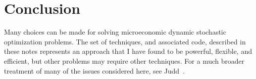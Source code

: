 \documentclass[SolvingMicroDSOPs]{subfiles}
\begin{document}
\hypertarget{conclusion}{}
\section{Conclusion}

Many choices can be made for solving microeconomic dynamic stochastic optimization problems.  The set of techniques, and associated code, described in these notes represents an approach that I have found to be powerful, flexible, and efficient, but other problems may require other techniques.  For a much broader treatment of many of the issues considered here, see Judd~\citeyearpar{judd:book}.
\end{document}
